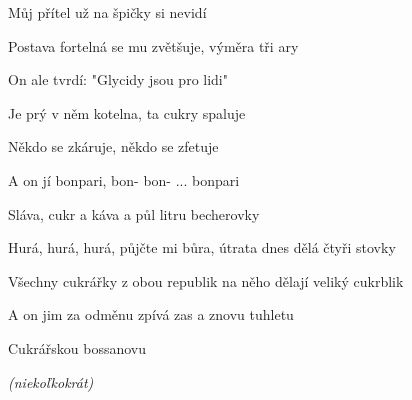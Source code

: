 \begin{song}
\bigskip
\Refren
\bigskip

Můj přítel  už na špičky si nevidí  \par
Postava fortelná se mu zvětšuje, výměra tři ary  \par
On ale tvrdí:  "Glycidy jsou pro lidi"\  \par
Je prý v něm kotelna, ta cukry spaluje \par
Někdo se zkáruje, někdo se zfetuje \par
A on jí bonpari, bon- bon- ...   bonpari  \par

\bigskip

Sláva,  cukr a káva a půl litru becherovky \par
{}Hurá, hurá, hurá, půjčte mi bůra, útrata dnes dělá čtyři stovky \par
Všechny cukrářky z obou republik na něho dělají veliký cukrblik \par
A on jim za odměnu zpívá zas a znovu tuhletu  \par
Cukrářskou bossanovu    \par

\bigskip

\Outro \par
{}    \textit{(niekoľkokrát)} \par
{} \par

\end{song}
